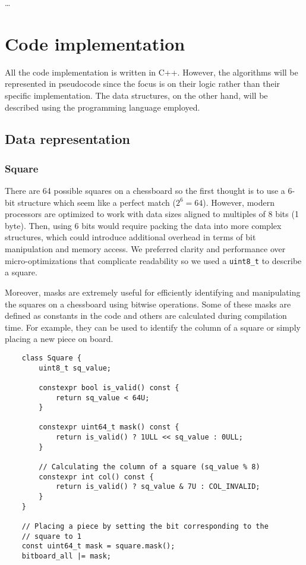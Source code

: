 \ldots

\section{Code implementation}
\label{sec:code}

All the code implementation is written in C++. However, the algorithms will be represented in pseudocode since the focus is on their logic rather than their specific implementation. The data structures, on the other hand, will be described using the programming language employed.

\subsection{Data representation}

\subsubsection{Square}

There are 64 possible squares on a chessboard so the first thought is to use a 6-bit structure which seem like a perfect match ($2^6 = 64$). However, modern processors are optimized to work with data sizes aligned to multiples of 8 bits (1 byte). Then, using 6 bits would require packing the data into more complex structures, which could introduce additional overhead in terms of bit manipulation and memory access. We preferred clarity and performance over micro-optimizations that complicate readability so we used a \texttt{uint8\_t} to describe a square.

\vspace{1em}

\noindent Moreover, masks are extremely useful for efficiently identifying and manipulating the squares on a chessboard using bitwise operations. Some of these masks are defined as constants in the code and others are calculated during compilation time. For example, they can be used to identify the column of a square or simply placing a new piece on board.

\begin{lstlisting}
    class Square {
        uint8_t sq_value;

        constexpr bool is_valid() const {
            return sq_value < 64U;
        }

        constexpr uint64_t mask() const {
            return is_valid() ? 1ULL << sq_value : 0ULL;
        }

        // Calculating the column of a square (sq_value % 8)
        constexpr int col() const {
            return is_valid() ? sq_value & 7U : COL_INVALID;
        }
    }

    // Placing a piece by setting the bit corresponding to the
    // square to 1
    const uint64_t mask = square.mask();
    bitboard_all |= mask;
\end{lstlisting}

